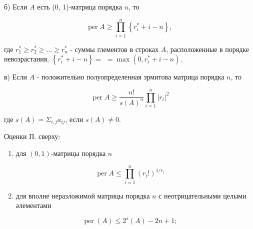 \documentclass[10pt]{article}
\begin{document}
б) Если $A$ есть (0, 1)-матрица порядка $n$, то



\[

\operatorname{per} A \geqslant \prod_{i=1}^{n}\left\{r_{i}^{*}+i-n\right\} \text {, }

\]



где $r_{1}^{*} \geqslant r_{2}^{*} \geqslant \ldots \geqslant r_{n}^{*}$ - суммы глементов в строках $A$, расположенные в порядке невозрастания, $\left\{r_{i}^{*}+i-n\right\}=$ $=\max \left(0, r_{i}^{*}+i-n\right)$.



в) Если $A$ - положительно полуопределенная эрмитова матрица порядка $n$, то



\[

\operatorname{per} A \geqslant \frac{n !}{s(A)^{n}} \prod_{i=1}^{n}\left|r_{i}\right|^{2}

\]



где $s(A)=\Sigma_{i, j} a_{i j}$, если $s(A) \neq 0$.



Оценки П. сверху:



\begin{enumerate}

  \item для $(0,1)$-матрицы порядка $n$

\end{enumerate}



\[

\operatorname{per} A \leqslant \prod_{i=1}^{n}\left(r_{i} !\right)^{1 / r_{i}}

\]



\begin{enumerate}

  \setcounter{enumi}{1}

  \item для вполне неразложимой матрицы порядка $n$ с неотрицательными целыми әлементами

\end{enumerate}



\[

\operatorname{per}(A) \leqslant 2^{s}(A)-2 n+1 ;

\]
\end{document}
